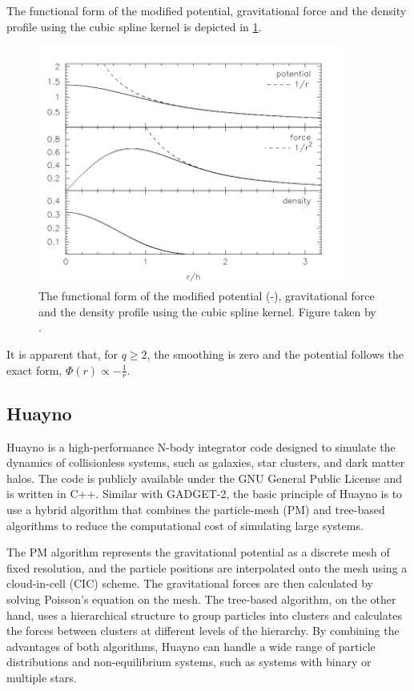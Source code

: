 The functional form of the modified potential, gravitational force and the density profile using the cubic spline kernel is depicted in \cref{fig:smoothened_gravity}.
\begin{figure}[H]
    \centering
    \includegraphics[width=0.9\textwidth]{Thesis/figures/smoothening.pdf}
    \caption{The functional form of the modified potential (-), gravitational force and the density profile using the cubic spline kernel. Figure taken by \cite{price2007energy}.}
    \label{fig:smoothened_gravity}
\end{figure}
It is apparent that, for $q \geq 2$, the smoothing is zero and the potential follows the exact form, $\Phi(r) \propto -\frac{1}{r}$. 


\subsection{Huayno}

Huayno \citep{pelupessy2012n} is a high-performance N-body integrator code designed to simulate the dynamics of collisionless systems, such as galaxies, star clusters, and dark matter halos. The code is publicly available under the GNU General Public License and is written in C++. Similar with GADGET-2, the basic principle of Huayno is to use a hybrid algorithm \citep{bode2000tree} that combines the particle-mesh (PM) \citep{klypin1983three} and tree-based algorithms \citep{barnes1986hierarchical,dehnen2000very} to reduce the computational cost of simulating large systems.


The PM algorithm represents the gravitational potential as a discrete mesh of fixed resolution, and the particle positions are interpolated onto the mesh using a cloud-in-cell (CIC) scheme. The gravitational forces are then calculated by solving Poisson's equation on the mesh. The tree-based algorithm, on the other hand, uses a hierarchical structure to group particles into clusters and calculates the forces between clusters at different levels of the hierarchy. By combining the advantages of both algorithms, Huayno can handle a wide range of particle distributions and non-equilibrium systems, such as systems with binary or multiple stars.


